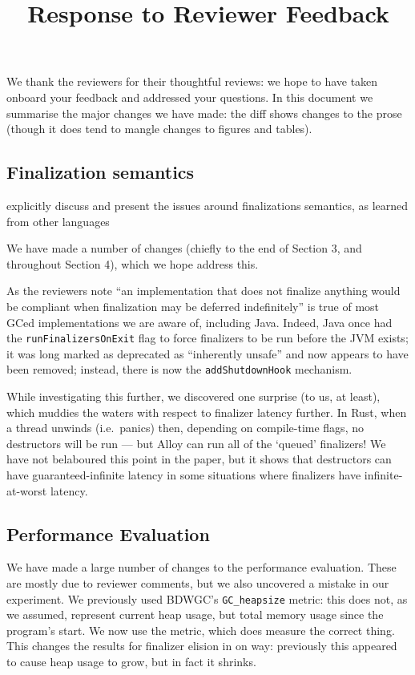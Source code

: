 \documentclass[12pt,a4paper,preprint]{article}
\newcommand\boehm{\textsc{BDWGC}\xspace}
\begin{document}
\date{}  %
\title{Response to Reviewer Feedback}
\maketitle

We thank the reviewers for their thoughtful reviews: we hope to have
taken onboard your feedback and addressed your questions. In this document
we summarise the major changes we have made: the diff shows changes to the prose
(though it does tend to mangle changes to figures and tables).


\subsection*{Finalization semantics}

\begin{blockquote}
explicitly discuss and present the issues around finalizations semantics, as
  learned from other languages
\end{blockquote}

We have made a number of changes (chiefly to the end of Section 3, and
throughout Section 4), which we hope address this.

As the reviewers note ``an
implementation that does not finalize anything would be compliant when
finalization may be deferred indefinitely'' is true of most GCed
implementations we are aware of, including Java. Indeed, Java once had the
\lstinline{runFinalizersOnExit} flag to force finalizers to be run before the
JVM exists; it was long marked as deprecated as ``inherently unsafe'' and
now appears to have been removed; instead,
there is now the \lstinline{addShutdownHook} mechanism.

While investigating this further, we discovered one surprise (to us, at least),
which muddies the waters with respect to finalizer latency further. In Rust,
when a thread unwinds (i.e.~panics) then, depending on compile-time flags, no
destructors will be run --- but Alloy can run all of the `queued' finalizers!
We have not belaboured this point in the paper, but it shows that destructors
can have guaranteed-infinite latency in some situations where finalizers have
infinite-at-worst latency.


\subsection*{Performance Evaluation}

We have made a large number of changes to the performance evaluation. These are
mostly due to reviewer comments, but we also uncovered a mistake in our
experiment. We previously used \boehm's \lstinline{GC_heapsize} metric:
this does not, as we assumed, represent current heap usage, but total
memory usage since the program's start. We now use the  metric,
which does measure the correct thing. This changes the results for finalizer
elision in on way: previously this appeared to cause heap usage to grow, but in
fact it shrinks.
\end{document}
